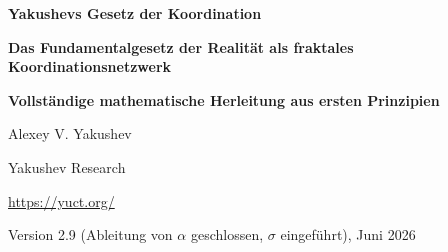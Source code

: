 \documentclass[12pt,a4paper]{article}
\theoremstyle{remark}
\begin{document}
	
	\begin{titlepage}
		\centering
		\vspace*{2cm}
		
		{\Huge\bfseries Yakushevs Gesetz der Koordination\par}
		\vspace{0.5cm}
		{\Large\bfseries Das Fundamentalgesetz der Realität als fraktales Koordinationsnetzwerk\par}
		\vspace{0.3cm}
		{\Large\bfseries Vollständige mathematische Herleitung aus ersten Prinzipien\par}
		
		\vspace{1.5cm}
		
		{\large Alexey V. Yakushev\par}
		\vspace{0.3cm}
		{\normalsize Yakushev Research\par}
		\vspace{0.2cm}
		{\normalsize \url{https://yuct.org/}\par}
		
		\vspace{1.0cm}
		{\normalsize Version 2.9 (Ableitung von $\alpha$ geschlossen, $\sigma$ eingeführt), Juni 2026\par}
		
		\vfill
		

\end{titlepage}
\end{document}
